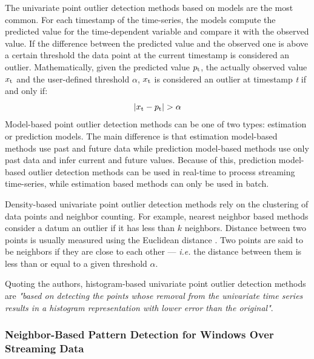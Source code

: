 The univariate point outlier detection methods based on models are the most common. For each timestamp of the time-series, the models compute the predicted value for the time-dependent variable and compare it with the observed value. If the difference between the predicted value and the observed one is above a certain threshold the data point at the current timestamp is considered an outlier. Mathematically, given the predicted value $p\textsubscript{t}$, the actually observed value $x\textsubscript{t}$ and the user-defined threshold $\alpha$, $x\textsubscript{t}$ is considered an outlier at timestamp \textit{t} if and only if:
\begin{equation*}
    |x\textsubscript{t}-p\textsubscript{t}|>\alpha
\end{equation*}
Model-based point outlier detection methods can be one of two types: estimation or prediction models. The main difference is that estimation model-based methods use past and future data while prediction model-based methods use only past data and infer current and future values. Because of this, prediction model-based outlier detection methods can be used in real-time to process streaming time-series, while estimation based methods can only be used in batch.

Density-based univariate point outlier detection methods rely on the clustering of data points and neighbor counting. For example, nearest neighbor based methods consider a datum an outlier if it has less than $k$ neighbors. Distance between two points is usually measured using the Euclidean distance \cite{elementary-algebra}. Two points are said to be neighbors if they are close to each other --- \textit{i.e.} the distance between them is less than or equal to a given threshold $\alpha$.

Quoting the authors, histogram-based univariate point outlier detection methods are \textit{"based on detecting the points whose removal from the univariate time series results in a histogram representation with lower error than the original"}.

\subsubsection{Neighbor-Based Pattern Detection for Windows Over Streaming Data} \label{alg:extran}

